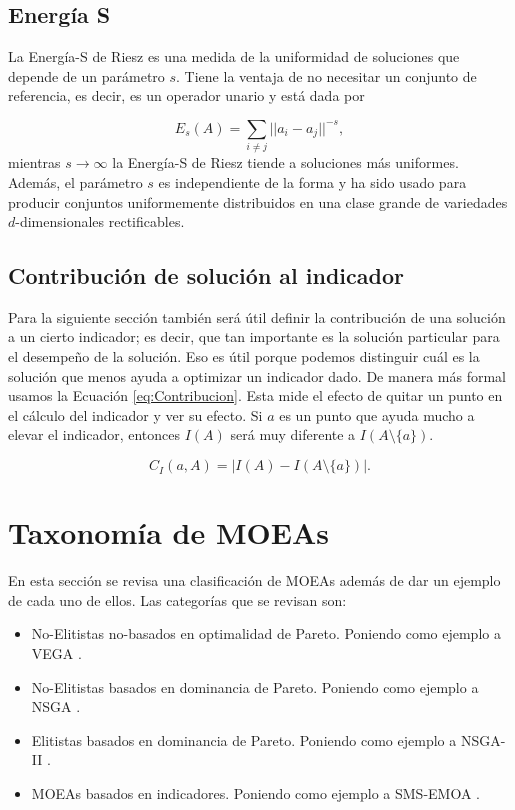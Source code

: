 \subsection{Energía S} \label{sec:Energía-S}
La Energía-S de Riesz \cite{sEnergy} es una medida de la uniformidad de soluciones que depende de un parámetro $s$. Tiene la ventaja de no necesitar un conjunto de referencia, es decir, es un operador unario y está dada por 

\begin{equation} \label{eq:S_energy}
    E_s(A)=\sum_{i\neq j} ||a_i-a_j||^{-s},
\end{equation}
mientras $s\rightarrow \infty$ la Energía-S de Riesz tiende a soluciones más uniformes. Además, el parámetro $s$ es independiente de la forma y ha sido usado para producir conjuntos uniformemente distribuidos en una clase grande de variedades $d$-dimensionales rectificables.

\subsection*{Contribución de solución al indicador}
Para la siguiente sección también será útil definir la contribución de una solución a un cierto indicador; es decir, que tan importante es la solución particular para el desempeño de la solución. Eso es útil porque podemos distinguir cuál es la solución que menos ayuda a optimizar un indicador dado. De manera más formal usamos la Ecuación \eqref{eq:Contribucion}. Esta mide el efecto de quitar un punto en el cálculo del indicador y ver su efecto. Si $a$ es un punto que ayuda mucho a elevar el indicador, entonces $I(A)$ será muy diferente a $I(A \setminus \{a\})$.

\begin{equation} \label{eq:Contribucion}
    C_I(a,A)=|I(A)-I(A \setminus \{a\}) |.
\end{equation}


\section{Taxonomía de MOEAs} \label{sec:QIs_tax}

En esta sección se revisa una clasificación de MOEAs además de dar un ejemplo de cada uno de ellos. Las categorías que se revisan son: 

\begin{itemize}
\item No-Elitistas no-basados en optimalidad de Pareto. Poniendo como ejemplo a VEGA \cite{schafferMultipleObjectiveOptimization1984}.
\item No-Elitistas basados en dominancia de Pareto. Poniendo como ejemplo a NSGA \cite{debFastElitistNondominated2000}.
\item Elitistas basados en dominancia de Pareto. Poniendo como ejemplo a NSGA-II \cite{seifbarghyNovelMetaheuristicAlgorithm2016}.
\item MOEAs basados en indicadores. Poniendo como ejemplo a SMS-EMOA \cite{SMS-EMOA}.
\end{itemize}


